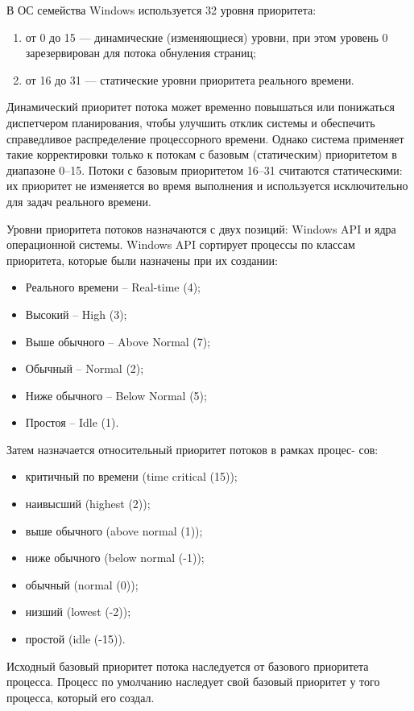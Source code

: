 В ОС семейства Windows используется 32 уровня приоритета:
\begin{enumerate}
	\item от 0 до 15 --- динамические (изменяющиеся) уровни, при этом уровень 0 зарезервирован для потока обнуления страниц;
	\item от 16 до 31 --- статические уровни приоритета реального времени.
\end{enumerate} 

Динамический приоритет потока может временно повышаться или понижаться диспетчером планирования, чтобы улучшить отклик системы и обеспечить справедливое распределение процессорного времени. Однако система применяет такие корректировки только к потокам с базовым (статическим) приоритетом в диапазоне 0–15. Потоки с базовым приоритетом 16–31 считаются статическими: их приоритет не изменяется во время выполнения и используется исключительно для задач реального времени.

Уровни приоритета потоков назначаются с двух позиций: Windows API и ядра операционной системы. Windows API сортирует процессы по классам 
приоритета, которые были назначены при их создании:
\begin{itemize}
	\item Реального времени -- Real-time (4); 
	\item Высокий -- High (3);
	\item Выше обычного -- Above Normal (7);
	\item Обычный -- Normal (2);
	\item Ниже обычного -- Below Normal (5);
	\item Простоя -- Idle (1).
\end{itemize}

Затем назначается относительный приоритет потоков в рамках процес-
сов:
\begin{itemize}
	\item критичный по времени (time critical (15));
	\item наивысший (highest (2));
	\item выше обычного (above normal (1));
	\item ниже обычного (below normal (-1));
	\item обычный (normal (0));
	\item низший (lowest (-2));
	\item простой (idle (-15)).
\end{itemize}

Исходный базовый приоритет потока наследуется от базового приоритета процесса. Процесс по умолчанию наследует свой базовый приоритет у того 
процесса, который его создал.

